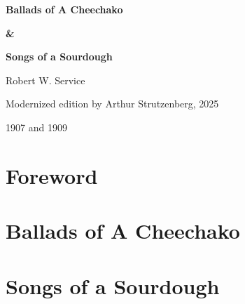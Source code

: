 \documentclass[10pt]{book}
\begin{document}
\begin{titlepage}
\centering
{\Huge\bfseries Ballads of A Cheechako\par}
{\Huge\bfseries \&\par}
{\Huge\bfseries Songs of a Sourdough\par}
\vspace{2cm}

{\Large Robert W. Service\par}
\vfill
{\large Modernized edition by Arthur Strutzenberg, 2025\par}
\vspace{1cm}{\large Originally Published by William Briggs, Toronto\par}
{\large 1907 and 1909}
\end{titlepage}

\frontmatter
\tableofcontents
\newpage

\mainmatter

\cleardoublepage
\chapter*{Foreword}



\cleardoublepage
\chapter*{Ballads of A Cheechako}


\cleardoublepage
\chapter*{Songs of a Sourdough}

\end{document}
